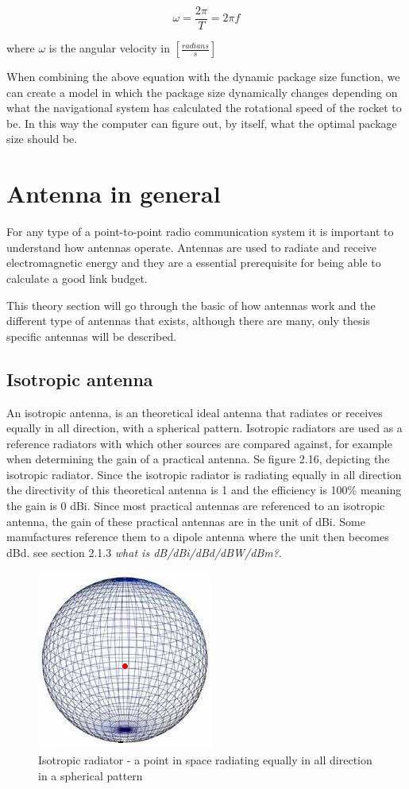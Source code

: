 \begin{equation}
    \omega = \frac{2\pi}{T} = 2 \pi f
\end{equation}

where $\omega$ is the angular velocity in $[\frac{radians}{s}]$

When combining the above equation with the dynamic package size function, we can create a model in which the package size dynamically changes depending on what the navigational system has calculated the rotational speed of the rocket to be. In this way the computer can figure out, by itself, what the optimal package size should be.

\section{Antenna in general}
For any type of a point-to-point radio communication system it is important to understand how antennas operate. Antennas are used to radiate and receive electromagnetic energy and they are a essential prerequisite for being able to calculate a good link budget.

This theory section will go through the basic of how antennas work and the different type of antennas that exists, although there are many, only thesis specific antennas will be described.

\subsection{Isotropic antenna}
An isotropic antenna, is an theoretical ideal antenna that radiates or receives equally in all direction, with a spherical pattern. Isotropic radiators are used as a reference radiators with which other sources are compared against, for example when determining the gain of a practical antenna. Se figure 2.16, depicting the isotropic radiator. Since the isotropic radiator is radiating equally in all direction the directivity of this theoretical antenna is 1 and the efficiency is 100\% meaning the gain is 0 dBi. Since most practical antennas are referenced to an isotropic antenna, the gain of these practical antennas are in the unit of dBi. Some manufactures reference them to a dipole antenna where the unit then becomes dBd. see section 2.1.3 \textit{what is dB/dBi/dBd/dBW/dBm?}.  

\begin{figure}[h]
\centering
\includegraphics[scale=1.3]{figures/Isotropic.png}
\caption{Isotropic radiator - a point in space radiating equally in all direction in a spherical pattern}
\end{figure}

